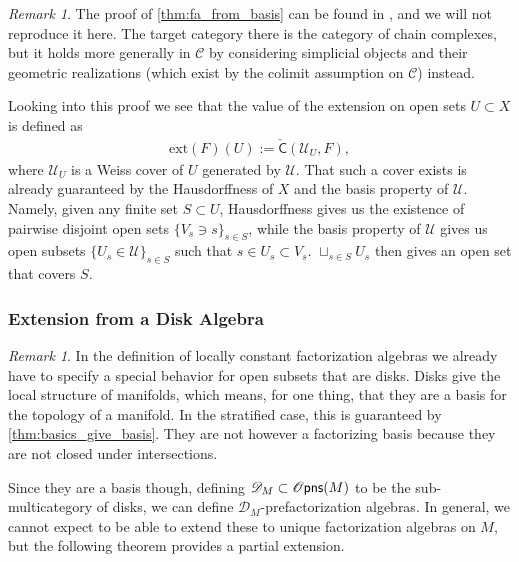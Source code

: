 \documentclass[12pt,a4paper]{article}
\newcounter{counter} \numberwithin{counter}{section}
\theoremstyle{definition}
\theoremstyle{plain}
\theoremstyle{remark}
\newtheorem{remark}[counter]{Remark}
\newcommand{\catC}{\mathscr{C}}
\newcommand{\opens}[1][s]{%
    \ifx r#1\mathsf{Opns}\else
    \ifx s#1\mathscr{O} \mathsf{pns}\else
    \mathrm{Illegal~option}%
    \fi\fi
}
\newcommand{\cech}{\check{\mathsf{C}}}
\begin{document}
\begin{remark}
    The proof of \cref{thm:fa_from_basis} can be found in \cite[ch.7.2]{cg2016}, and we will not reproduce it here. The target category there is the category of chain complexes, but it holds more generally in $\catC$ by considering simplicial objects and their geometric realizations (which exist by the colimit assumption on $\catC$) instead.

    Looking into this proof we see that the value of the extension on open sets $U \subset X$ is defined as
    \begin{align}
        \mathrm{ext}(F)(U) := \cech(\mathscr{U}_U, F),
    \end{align}
    where $\mathscr{U}_U$ is a Weiss cover of $U$ generated by $\mathscr{U}$. That such a cover exists is already guaranteed by the Hausdorffness of $X$ and the basis property of $\mathscr{U}$. Namely, given any finite set $S \subset U$, Hausdorffness gives us the existence of pairwise disjoint open sets $\{ V_s \ni s\}_{s \in S}$, while the basis property of $\mathscr{U}$ gives us open subsets $\{ U_s \in \mathscr{U} \}_{s \in S}$ such that $s \in U_s \subset V_s$. $\sqcup_{s \in S} U_s$ then gives an open set that covers $S$.
\end{remark}


\subsubsection{Extension from a Disk Algebra}

\begin{remark}
    In the definition of locally constant factorization algebras we already have to specify a special behavior for open subsets that are disks. Disks give the local structure of manifolds, which means, for one thing, that they are a basis for the topology of a manifold. In the stratified case, this is guaranteed by \cref{thm:basics_give_basis}. They are not however a factorizing basis because they are not closed under intersections.

    Since they are a basis though, defining $\mathscr{D}_M \subset \opens[s](M)$ to be the sub-multicategory of disks, we can define $\mathscr{D}_M$-prefactorization algebras. In general, we cannot expect to be able to extend these to unique factorization algebras on $M$, but the following theorem provides a partial extension.
\end{remark}
\end{document}
